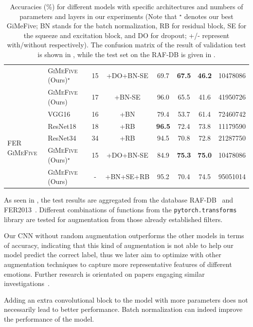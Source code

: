 \begin{table}[ht]
\begin{tabular}{@{}llcccccr@{}}
    &\textsc{GiMeFive} (Ours)\textcolor{LMUGreen}{$^\star$} & 15 & +DO+BN-SE & 69.7 & \textbf{67.5} & \textbf{46.2} & 10478086 \\
    &\textsc{GiMeFive} (Ours) & 17 & +BN-SE & 96.0 & 65.5 & 41.6 & 41950726 \\
    \midrule
    \midrule
    \multirow{5}{*}{FER \textsc{GiMeFive}} & VGG16~\cite{SimonyanZ14a} & 16 & +BN & 79.4 & 53.7 & 61.4 & 72460742 \\
    & ResNet18~\cite{HeZRS16} & 18 & +RB  & \textbf{96.5} & 72.4 & 73.8 & 11179590 \\
    & ResNet34~\cite{HeZRS16} & 34 & +RB  & 94.5 & 70.8 & 72.8 & 21287750 \\
    &\textsc{GiMeFive} (Ours)\textcolor{LMUGreen}{$^\star$} & 15 & +DO+BN-SE & 84.9 & \textbf{75.3} & \textbf{75.0} & 10478086 \\
    &\textsc{GiMeFive} (Ours) & - & +BN+SE+RB & 95.2 & 70.4 & 74.5 & 95051014 \\
    \bottomrule
  \end{tabular}
  \caption{Accuracies (\%) for different models with specific architectures and numbers of parameters and layers in our experiments 
  (Note that \textcolor{LMUGreen}{$^\star$} denotes our best GiMeFive; 
  BN stands for the batch normalization, 
  RB for residual block, 
  SE for the squeeze and excitation block, 
  and DO for dropout; 
  +/- represent with/without respectively). 
  The confusion matrix of the result of validation test is shown in , 
  while the test set on the RAF-DB is given in .} 
  \label{tab:model}
\end{table}

As seen in , 
the test results are aggregated from the database RAF-DB~\cite{kaggle_rafdb} and FER2013~\cite{kaggle_fer}.
Different combinations of functions from the \texttt{pytorch.transforms} library are tested for augmentation from those already established filters. 

Our CNN without random augmentation outperforms the other models in terms of accuracy, 
indicating that this kind of augmentation is not able to help our model predict the correct label, 
thus we later aim to optimize with other augmentation techniques to capture more representative features of different emotions.
Further research is orientated on papers engaging similar investigations~\cite{ZeilerF14,li_reliable_2017,VermaMRMV23}.

Adding an extra convolutional block to the model with more parameters does not necessarily lead to better performance.
Batch normalization can indeed improve the performance of the model. 

